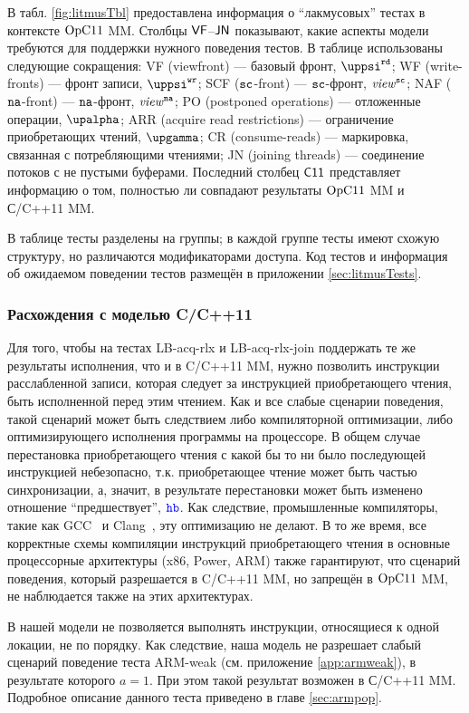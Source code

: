 В табл. \ref{fig:litmusTbl} предоставлена информация о ``лакмусовых'' тестах в контексте $\mathrm{OpC11}$ MM.
Столбцы ${\sf VF}$--${\sf JN}$ показывают, какие аспекты модели требуются для поддержки нужного поведения тестов.
В таблице использованы следующие сокращения:
  \textsf{VF} (viewfront) --- базовый фронт, $\stPsiRead$;
  \textsf{WF} (write-fronts) --- фронт записи, $\stPsiWrite$;
  \textsf{SCF} (${\mathtt{sc}}$-front) --- ${\mathtt{sc}}$-фронт, $\mathit{view}^{\text{\scriptsize{\texttt{sc}}}}$;
  \textsf{NAF} ($\mathtt{na}$-front) --- $\mathtt{na}$-фронт, $\mathit{view}^{\text{\scriptsize{\texttt{na}}}}$;
  \textsf{PO} (postponed operations) --- отложенные операции, $\stAlpha$;
  \textsf{ARR} (acquire read restrictions) --- ограничение приобретающих чтений, $\stGamma$;
  \textsf{CR} (consume-reads) --- маркировка, связанная с потребляющими чтениями;
  \textsf{JN} (joining threads) --- соединение потоков с не пустыми буферами.
Последний столбец ${\sf C11}$ представляет информацию о том, полностью ли совпадают результаты $\mathrm{OpC11}$ MM и С/C++11 MM.

В таблице тесты разделены на группы;
в каждой группе тесты имеют схожую структуру, но различаются модификаторами доступа.
Код тестов и информация об ожидаемом поведении тестов размещён в приложении \ref{sec:litmusTests}.

\subsubsection{Расхождения с моделью C/C++11}
Для того, чтобы на тестах \textrm{LB-acq-rlx} и \textrm{LB-acq-rlx-join} поддержать те же результаты исполнения,
что и в C/C++11 MM, нужно позволить инструкции расслабленной записи, которая следует за
инструкцией приобретающего чтения, быть исполненной перед этим чтением.
Как и все слабые сценарии поведения, такой сценарий может быть следствием либо компиляторной оптимизации,
либо оптимизирующего исполнения программы на процессоре.
В общем случае перестановка приобретающего чтения с какой бы то ни было последующей инструкцией небезопасно,
т.к. приобретающее чтение может быть частью синхронизации, а, значит, в результате перестановки может быть
изменено отношение ``предшествует'', $\lHB$. Как следствие, промышленные компиляторы, такие как
GCC~\cite{GCC} и Clang~\cite{CLANG}, эту оптимизацию не делают.
В то же время, все корректные схемы компиляции инструкций приобретающего чтения в основные процессорные архитектуры (x86, Power, ARM)
также гарантируют, что сценарий поведения, который разрешается в C/C++11 MM, но запрещён в $\mathrm{OpC11}$ MM,
не наблюдается также на этих архитектурах.

В нашей модели не позволяется выполнять инструкции, относящиеся к одной локации, не по порядку.
Как следствие, наша модель не разрешает слабый сценарий поведение теста \textrm{ARM-weak}
(см. приложение \ref{app:armweak}), в результате которого $a = 1$.
При этом такой результат возможен в С/C++11 MM.
Подробное описание данного теста приведено в главе \ref{sec:armpop}.

